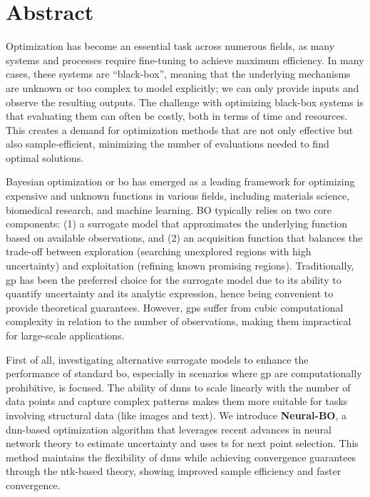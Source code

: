 \chapter*{Abstract} %
\label{chap:abstract}
Optimization has become an essential task across numerous fields, as many systems and processes require fine-tuning to achieve maximum efficiency. In many cases, these systems are ``black-box'', meaning that the underlying mechanisms are unknown or too complex to model explicitly; we can only provide inputs and observe the resulting outputs. The challenge with optimizing black-box systems is that evaluating them can often be costly, both in terms of time and resources. This creates a demand for optimization methods that are not only effective but also sample-efficient, minimizing the number of evaluations needed to find optimal solutions. 


Bayesian optimization or \ac{bo} has emerged as a leading framework for optimizing expensive and unknown functions in various fields, including materials science, biomedical research, and machine learning. BO typically relies on two core components: (1) a surrogate model that approximates the underlying function based on available observations, and (2) an acquisition function that balances the trade-off between exploration (searching unexplored regions with high uncertainty) and exploitation (refining known promising regions). Traditionally, \ac{gp} has been the preferred choice for the surrogate model due to its ability to quantify uncertainty and its analytic expression, hence being convenient to provide theoretical guarantees. However, \acp{gp} suffer from cubic computational complexity in relation to the number of observations, making them impractical for large-scale applications.


First of all, investigating alternative surrogate models to enhance the performance of standard \ac{bo}, especially in scenarios where \ac{gp} are computationally prohibitive, is focused. 
The ability of \acp{dnn} to scale linearly with the number of data points and capture complex patterns makes them more suitable for tasks involving structural data (like images and text). We introduce \textbf{Neural-BO}, a \ac{dnn}-based optimization algorithm that leverages recent advances in neural network theory to estimate uncertainty and uses \ac{ts} for next point selection. This method maintains the flexibility of \acp{dnn} while achieving convergence guarantees through the \ac{ntk}-based theory, showing improved sample efficiency and faster convergence.   

